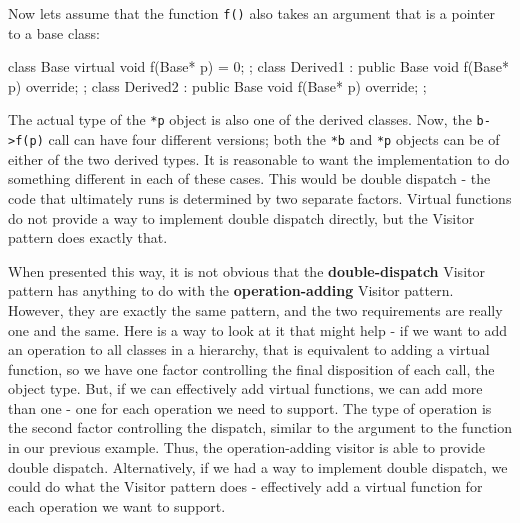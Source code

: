 Now let\textquotesingle s assume that the function \texttt{f()} also takes an argument that is a pointer to a base class:

\begin{code}
class Base {
  virtual void f(Base* p) = 0;
};
class Derived1 : public Base {
  void f(Base* p) override;
};
class Derived2 : public Base {
  void f(Base* p) override;
};
\end{code}

The actual type of the \texttt{*p} object is also one of the derived classes. Now, the \texttt{b-\textgreater{}f(p)} call can have four different versions; both the \texttt{*b} and \texttt{*p} objects can be of either of the two derived types. It is reasonable to want the implementation to do something different in each of these cases. This would be double dispatch - the code that ultimately runs is determined by two separate factors. Virtual functions do not provide a way to implement double dispatch directly, but the Visitor pattern does exactly that.

When presented this way, it is not obvious that the \textbf{double-dispatch} Visitor pattern has anything to do with the \textbf{operation-adding} Visitor pattern. However, they are exactly the same pattern, and the two requirements are really one and the same. Here is a way to look at it that might help - if we want to add an operation to all classes in a hierarchy, that is equivalent to adding a virtual function, so we have one factor controlling the final disposition of each call, the object type. But, if we can effectively add virtual functions, we can add more than one - one for each operation we need to support. The type of operation is the second factor controlling the dispatch, similar to the argument to the function in our previous example. Thus, the operation-adding visitor is able to provide double dispatch. Alternatively, if we had a way to implement double dispatch, we could do what the Visitor pattern does - effectively add a virtual function for each operation we want to support.

